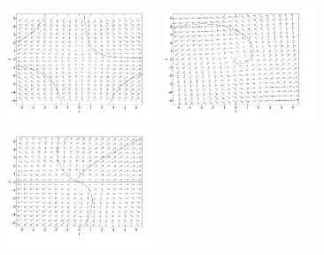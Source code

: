 \documentclass{ximera}
\begin{document}
\begin{computerExercise}
\begin{solution}
\begin{figure}[htb]
                       \centerline{%
                       \includegraphics[width=1.8in]{exfigure/6-3-3a.pdf}
                       \includegraphics[width=1.8in]{exfigure/6-3-3b.pdf}
                       \includegraphics[width=1.8in]{exfigure/6-3-3c.pdf}}
\end{figure}
\end{solution}
\end{computerExercise}
\end{document}
